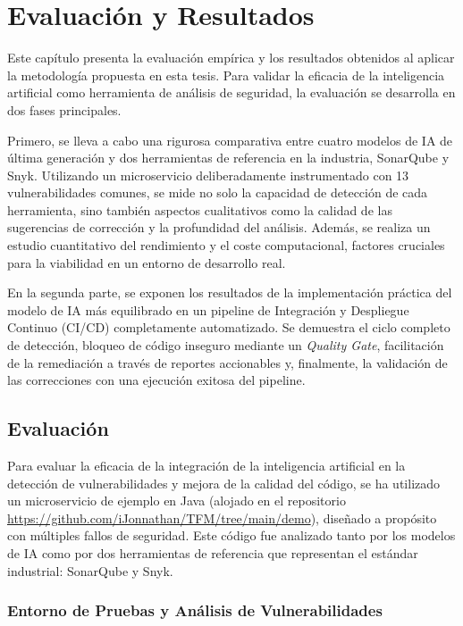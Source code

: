
\chapter{Evaluación y Resultados}
\label{chap:implementacion}
Este capítulo presenta la evaluación empírica y los resultados obtenidos al aplicar la metodología propuesta en esta tesis. Para validar la eficacia de la inteligencia artificial como herramienta de análisis de seguridad, la evaluación se desarrolla en dos fases principales.


Primero, se lleva a cabo una rigurosa comparativa entre cuatro modelos de IA de última generación y dos herramientas de referencia en la industria, SonarQube y Snyk. Utilizando un microservicio deliberadamente instrumentado con 13 vulnerabilidades comunes, se mide no solo la capacidad de detección de cada herramienta, sino también aspectos cualitativos como la calidad de las sugerencias de corrección y la profundidad del análisis. Además, se realiza un estudio cuantitativo del rendimiento y el coste computacional, factores cruciales para la viabilidad en un entorno de desarrollo real.


En la segunda parte, se exponen los resultados de la implementación práctica del modelo de IA más equilibrado en un pipeline de Integración y Despliegue Continuo (CI/CD) completamente automatizado. Se demuestra el ciclo completo de detección, bloqueo de código inseguro mediante un \textit{Quality Gate}, facilitación de la remediación a través de reportes accionables y, finalmente, la validación de las correcciones con una ejecución exitosa del pipeline.

\section{Evaluación}
\label{sec:evaluacion}
Para evaluar la eficacia de la integración de la inteligencia artificial en la detección de vulnerabilidades y mejora de la calidad del código, se ha utilizado un microservicio de ejemplo en Java (alojado en el repositorio \url{https://github.com/iJonnathan/TFM/tree/main/demo}), diseñado a propósito con múltiples fallos de seguridad. Este código fue analizado tanto por los modelos de IA como por dos herramientas de referencia que representan el estándar industrial: SonarQube y Snyk.

\subsection{Entorno de Pruebas y Análisis de Vulnerabilidades}

